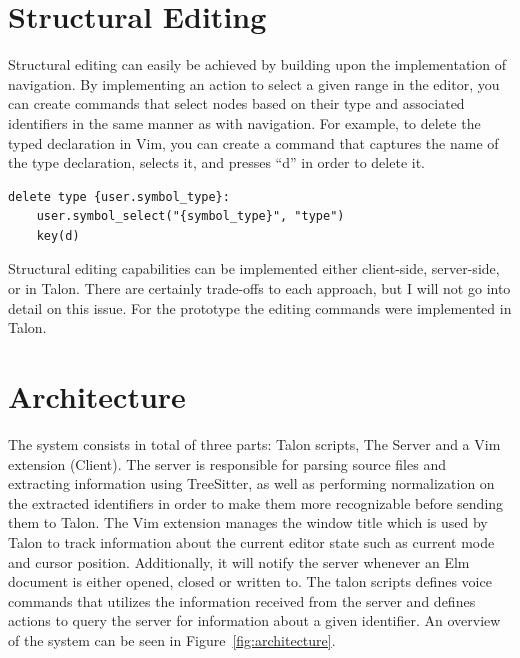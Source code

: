 \documentclass[../thesis.tex]{subfiles}
\begin{document}


\section{Structural Editing}%
\label{sec:structural_editing}
Structural editing can easily be achieved by building upon the implementation of navigation.
By implementing an action to select a given range in the editor, you can create commands
that select nodes based on their type and associated identifiers in the same manner as with navigation.
For example, to delete the typed declaration in Vim, you can create a command that captures the name of the type declaration,
selects it, and presses ``d'' in order to delete it.
\begin{verbatim}
delete type {user.symbol_type}: 
    user.symbol_select("{symbol_type}", "type")
    key(d)
\end{verbatim}
Structural editing capabilities can be implemented either client-side, server-side, or in Talon.
There are certainly trade-offs to each approach, but I will not go into detail on this issue.
For the prototype the editing commands were implemented in Talon.



\section{Architecture}%
\label{sec:architecture}
The system consists in total of three parts: Talon scripts, The Server and a Vim extension (Client).
The server is responsible for parsing source files and extracting information using TreeSitter,
as well as performing normalization on the extracted identifiers in order to make them
more recognizable before sending them to Talon.
The Vim extension manages the window title which is used by Talon to track information about the
current editor state such as current mode and cursor position. Additionally, it will notify
the server whenever an Elm document is either opened, closed or written to.
The talon scripts defines voice commands that utilizes the information received from the server
and defines actions to query the server for information about a given identifier.
An overview of the system can be seen in Figure~\ref{fig:architecture}.
\end{document}
